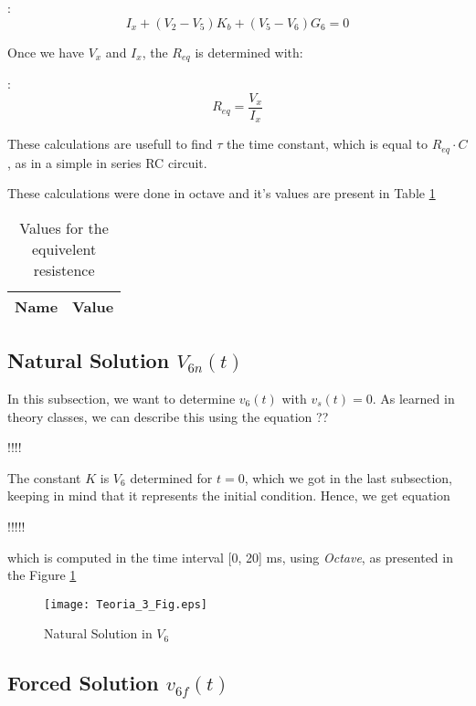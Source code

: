 :
\begin{equation}
  I_{x} + (V_{2} - V_{5})K_{b} + (V_{5} - V_{6})G_{6} = 0
\end{equation}

Once we have $V_x$ and $I_x$, the $R_{eq}$ is determined with:


:
\begin{equation}
  R_{eq} = \frac{V_x}{I_x}
\end{equation}

These calculations are usefull to find $\tau$ the time constant, which is equal to $R_{eq} \cdot C$, as in a simple in series RC circuit.

These calculations were done in octave and it's values are present in Table \ref{tabReq}

\begin{table}[!ht]
  \centering
  \begin{tabular}{|l|r|}
    \hline    
    {\bf Name} & {\bf Value} \\ \hline
    
  \end{tabular}
  \caption{Values for the equivelent resistence}
  \label{tabReq}
\end{table}


\subsection{Natural Solution $V_{6n}(t)$}
\label{subsec:Nat_Sol_theory}

In this subsection, we want to determine $v_6(t)$ with $v_s(t) = 0$. As learned in theory classes, we can describe this using the equation ??

!!!!


The constant $K$ is $V_6$ determined for $t=0$, which we got in the last subsection, keeping in mind that it represents the initial condition. Hence, we get equation 

!!!!!

which is computed in the time interval [0, 20] ms, using \textit{Octave}, as presented in the Figure \ref{plot3}

\begin{figure}[h]
\centering
\caption{Natural Solution in $V_6$}
\texttt{[image: Teoria\_3\_Fig.eps]}
\label{plot3}
\end{figure}

\newpage

\subsection{Forced Solution $v_{6f}(t)$}
\label{subsec:Forced_Sol_theory}


